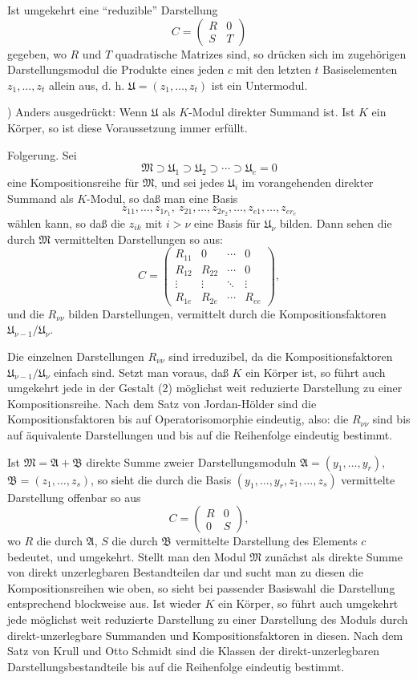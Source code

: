 \documentclass[11pt]{article}
\providecommand{\mA}{\mathfrak{A}}
\providecommand{\mB}{\mathfrak{B}}
\providecommand{\mM}{\mathfrak{M}}
\providecommand{\mU}{\mathfrak{U}}
\begin{document}
Ist umgekehrt eine ``reduzible'' Darstellung
\[
        C=\begin{pmatrix}R&0\\ S&T\end{pmatrix}
\]
gegeben, wo $R$ und $T$ quadratische Matrizes sind, so drücken sich im zugehörigen Darstellungsmodul die Produkte eines jeden $c$ mit den letzten $t$ Basiselementen $z_1,\ldots,z_t$ allein aus, d. h. $\mU=(z_1,\ldots,z_t)$ ist ein Untermodul.

{\footnotesize{}) Anders ausgedrückt: Wenn $\mU$ als $K$-Modul direkter Summand ist. Ist $K$ ein Körper, so ist diese Voraussetzung immer erfüllt.\par}

Folgerung. Sei
\[
        \mM\supset \mU_1\supset \mU_2\supset\cdots\supset \mU_e=0
\]
eine Kompositionsreihe für $\mM$, und sei jedes $\mU_i$ im vorangehenden direkter Summand als $K$-Modul, so daß man eine Basis
\[
        z_{11},\ldots,z_{1r_1},\ z_{21},\ldots,z_{2r_2},\ldots,
        z_{e1},\ldots,z_{er_e}
\]
wählen kann, so daß die $z_{ik}$ mit $i>\nu$ eine Basis für $\mU_\nu$ bilden. Dann sehen die durch $\mM$ vermittelten Darstellungen so aus:
\[
 C=\begin{pmatrix}
 R_{11}&0&\cdots&0\\
 R_{12}&R_{22}&\cdots&0\\
 \vdots&\vdots&\ddots&\vdots\\
 R_{1e}&R_{2e}&\cdots&R_{ee}
 \end{pmatrix},                                      \tag{2}
\]
und die $R_{\nu\nu}$ bilden Darstellungen, vermittelt durch die Kompositionsfaktoren $\mU_{\nu-1}/\mU_\nu$.

Die einzelnen Darstellungen $R_{\nu\nu}$ sind irreduzibel, da die Kompositionsfaktoren $\mU_{\nu-1}/\mU_\nu$ einfach sind. Setzt man voraus, daß $K$ ein Körper ist, so führt auch umgekehrt jede in der Gestalt (2) möglichst weit reduzierte Darstellung zu einer Kompositionsreihe. Nach dem Satz von Jordan-Hölder sind die Kompositionsfaktoren bis auf Operatorisomorphie eindeutig, also: die $R_{\nu\nu}$ sind bis auf äquivalente Darstellungen und bis auf die Reihenfolge eindeutig bestimmt.

Ist $\mM=\mA+\mB$ direkte Summe zweier Darstellungsmoduln $\mA=(y_1,\ldots,y_r)$, $\mB=(z_1,\ldots,z_s)$, so sieht die durch die Basis $(y_1,\ldots,y_r,z_1,\ldots,z_s)$ vermittelte Darstellung offenbar so aus
\[
        C=\begin{pmatrix}R&0\\0&S\end{pmatrix},
\]
wo $R$ die durch $\mA$, $S$ die durch $\mB$ vermittelte Darstellung des Elements $c$ bedeutet, und umgekehrt. Stellt man den Modul $\mM$ zunächst als direkte Summe von direkt unzerlegbaren Bestandteilen dar und sucht man zu diesen die Kompositionsreihen wie oben, so sieht bei passender Basiswahl die Darstellung entsprechend blockweise aus. Ist wieder $K$ ein Körper, so führt auch umgekehrt jede möglichst weit reduzierte Darstellung zu einer Darstellung des Moduls durch direkt-unzerlegbare Summanden und Kompositionsfaktoren in diesen. Nach dem Satz von Krull und Otto Schmidt sind die Klassen der direkt-unzerlegbaren Darstellungsbestandteile bis auf die Reihenfolge eindeutig bestimmt.
\end{document}
